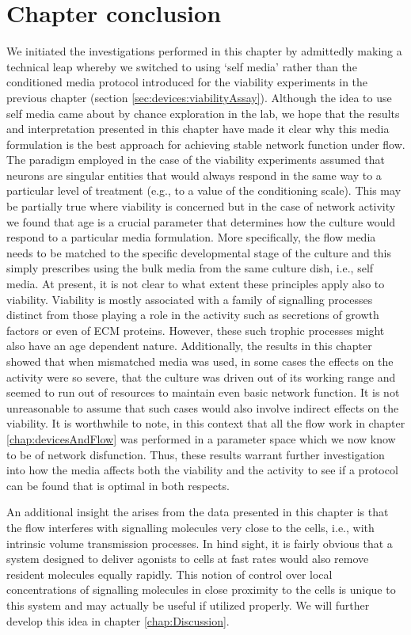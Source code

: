 \section{Chapter conclusion}
We initiated the investigations performed in this chapter by admittedly making a technical leap whereby we switched to using `self media' rather than the conditioned media protocol introduced for the viability experiments in the previous chapter (section \ref{sec:devices:viabilityAssay}). Although the idea to use self media came about by chance exploration in the lab, we hope that the results and interpretation presented in this chapter have made it clear why this media formulation is the best approach for achieving stable network function under flow. The paradigm employed in the case of the viability experiments assumed that neurons are singular entities that would always respond in the same way to a particular level of treatment (e.g., to a value of the conditioning scale). This may be partially true where viability is concerned but in the case of network activity we found that age is a crucial parameter that determines how the culture would respond to a particular media formulation. More specifically, the flow media needs to be matched to the specific developmental stage of the culture and this simply prescribes using the bulk media from the same culture dish, i.e., self media. At present, it is not clear to what extent these principles apply also to viability. Viability is mostly associated with a family of signalling processes distinct from those playing a role in the activity such as secretions of growth factors or even of ECM proteins. However, these such trophic processes might also have an age dependent nature. Additionally, the results in this chapter showed that when mismatched media was used, in some cases the effects on the activity were so severe, that the culture was driven out of its working range and seemed to run out of resources to maintain even basic network function. It is not unreasonable to assume that such cases would also involve indirect effects on the viability. It is worthwhile to note, in this context that all the flow work in chapter \ref{chap:devicesAndFlow} was performed in a parameter space which we now know to be of network disfunction. Thus, these results warrant further investigation into how the media affects both the viability and the activity to see if a protocol can be found that is optimal in both respects.

An additional insight the arises from the data presented in this chapter is that the flow interferes with signalling molecules very close to the cells, i.e., with intrinsic volume transmission processes. In hind sight, it is fairly obvious that a system designed to deliver agonists to cells at fast rates would also remove resident molecules equally rapidly. This notion of control over local concentrations of signalling molecules in close proximity to the cells is unique to this system and may actually be useful if utilized properly. We will further develop this idea in chapter \ref{chap:Discussion}.

